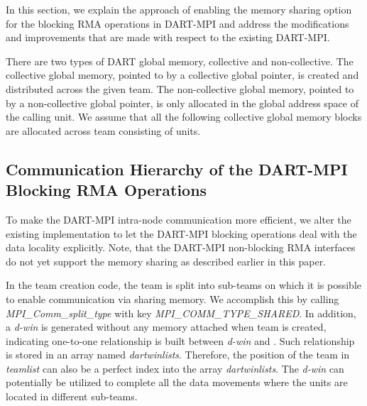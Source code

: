 \documentclass{llncs}
\newcommand{\todo}[1]{}
\begin{document}
{In this section, 
we explain the approach of enabling the memory sharing option for the blocking RMA operations in \mbox{DART-MPI}
and address the modifications and improvements that are made with respect to the existing \mbox{DART-MPI}.

There are two types of DART global memory, collective and non-collective\cite{dart-mpi}.
The collective global memory, pointed to by a collective global pointer, 
is created and distributed across the given team.
The non-collective global memory, pointed to by a non-collective global pointer, 
is only allocated in the global address space of the calling unit.
We assume that all the following collective global memory blocks are
allocated across team  consisting of  units.

\subsection{Communication Hierarchy of the DART-MPI Blocking RMA Operations}
To make the DART-MPI \mbox{intra-node} communication more efficient,
we alter the existing implementation
to let the \mbox{DART-MPI} blocking operations deal with the data locality explicitly.
\todo{Following sentence in discussion?} Note, that the DART-MPI non-blocking RMA interfaces do not yet support the memory sharing as 
described earlier in this paper. 

In the team creation code, 
the team  is split into \mbox{sub-teams} on which it is possible to enable communication via sharing memory. 
We accomplish this by calling {\em MPI\_Comm\_split\_type} with key
{\em MPI\_COMM\_TYPE\_SHARED}. In addition, a \mbox{\textit{d-win}} 
is generated without any memory attached 
when team  is created, indicating \mbox{one-to-one} relationship is built between 
\mbox{\textit{d-win}} and . Such relationship is stored in an array named {\em dartwinlists}.
Therefore, the position of the team  in \textit{teamlist}\cite{dart-mpi} can also be a perfect index into the 
array {\em dartwinlists}.
The \mbox{\textit{d-win}} can potentially be utilized to complete
all the data movements where the units are located in different \mbox{sub-teams}.


}
\end{document}
